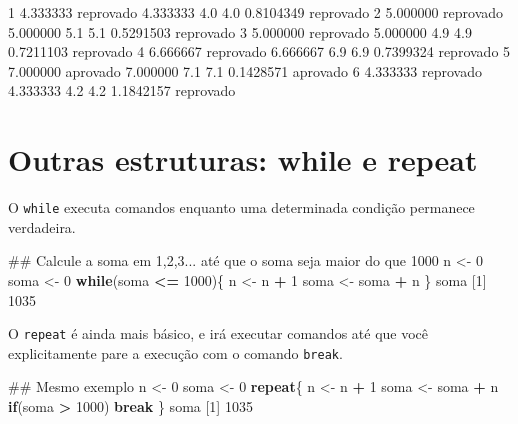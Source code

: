 \documentclass[10pt,a4paper]{book}
\newenvironment{Shaded}{\begin{snugshade}}{\end{snugshade}}
\newcommand{\DecValTok}[1]{\textcolor[rgb]{0.00,0.00,0.81}{#1}}
\newcommand{\FloatTok}[1]{\textcolor[rgb]{0.00,0.00,0.81}{#1}}
\newcommand{\StringTok}[1]{\textcolor[rgb]{0.31,0.60,0.02}{#1}}
\newcommand{\ControlFlowTok}[1]{\textcolor[rgb]{0.13,0.29,0.53}{\textbf{#1}}}
\newcommand{\OperatorTok}[1]{\textcolor[rgb]{0.81,0.36,0.00}{\textbf{#1}}}
\newcommand{\NormalTok}[1]{#1}
\begin{document}
\begin{Shaded}
\begin{Highlighting}[]
\DecValTok{1} \FloatTok{4.333333}\NormalTok{ reprovado    }\FloatTok{4.333333}      \FloatTok{4.0}       \FloatTok{4.0} \FloatTok{0.8104349}\NormalTok{ reprovado}
\DecValTok{2} \FloatTok{5.000000}\NormalTok{ reprovado    }\FloatTok{5.000000}      \FloatTok{5.1}       \FloatTok{5.1} \FloatTok{0.5291503}\NormalTok{ reprovado}
\DecValTok{3} \FloatTok{5.000000}\NormalTok{ reprovado    }\FloatTok{5.000000}      \FloatTok{4.9}       \FloatTok{4.9} \FloatTok{0.7211103}\NormalTok{ reprovado}
\DecValTok{4} \FloatTok{6.666667}\NormalTok{ reprovado    }\FloatTok{6.666667}      \FloatTok{6.9}       \FloatTok{6.9} \FloatTok{0.7399324}\NormalTok{ reprovado}
\DecValTok{5} \FloatTok{7.000000}\NormalTok{  aprovado    }\FloatTok{7.000000}      \FloatTok{7.1}       \FloatTok{7.1} \FloatTok{0.1428571}\NormalTok{  aprovado}
\DecValTok{6} \FloatTok{4.333333}\NormalTok{ reprovado    }\FloatTok{4.333333}      \FloatTok{4.2}       \FloatTok{4.2} \FloatTok{1.1842157}\NormalTok{ reprovado}
\end{Highlighting}
\end{Shaded}

\section{Outras estruturas: while e
repeat}\label{outras-estruturas-while-e-repeat}

O \texttt{while} executa comandos enquanto uma determinada condição
permanece verdadeira.

\begin{Shaded}
\begin{Highlighting}[]
\NormalTok{## Calcule a soma em 1,2,3... até que o soma seja maior do que 1000}
\NormalTok{n <-}\StringTok{ }\DecValTok{0}
\NormalTok{soma <-}\StringTok{ }\DecValTok{0}
\ControlFlowTok{while}\NormalTok{(soma }\OperatorTok{<=}\StringTok{ }\DecValTok{1000}\NormalTok{)\{}
\NormalTok{    n <-}\StringTok{ }\NormalTok{n }\OperatorTok{+}\StringTok{ }\DecValTok{1}
\NormalTok{    soma <-}\StringTok{ }\NormalTok{soma }\OperatorTok{+}\StringTok{ }\NormalTok{n}
\NormalTok{\}}
\NormalTok{soma}
\NormalTok{[}\DecValTok{1}\NormalTok{] }\DecValTok{1035}
\end{Highlighting}
\end{Shaded}

O \texttt{repeat} é ainda mais básico, e irá executar comandos até que
você explicitamente pare a execução com o comando \texttt{break}.

\begin{Shaded}
\begin{Highlighting}[]
\NormalTok{## Mesmo exemplo}
\NormalTok{n <-}\StringTok{ }\DecValTok{0}
\NormalTok{soma <-}\StringTok{ }\DecValTok{0}
\ControlFlowTok{repeat}\NormalTok{\{}
\NormalTok{    n <-}\StringTok{ }\NormalTok{n }\OperatorTok{+}\StringTok{ }\DecValTok{1}
\NormalTok{    soma <-}\StringTok{ }\NormalTok{soma }\OperatorTok{+}\StringTok{ }\NormalTok{n}
    \ControlFlowTok{if}\NormalTok{(soma }\OperatorTok{>}\StringTok{ }\DecValTok{1000}\NormalTok{) }\ControlFlowTok{break}
\NormalTok{\}}
\NormalTok{soma}
\NormalTok{[}\DecValTok{1}\NormalTok{] }\DecValTok{1035}
\end{Highlighting}
\end{Shaded}
\end{document}
